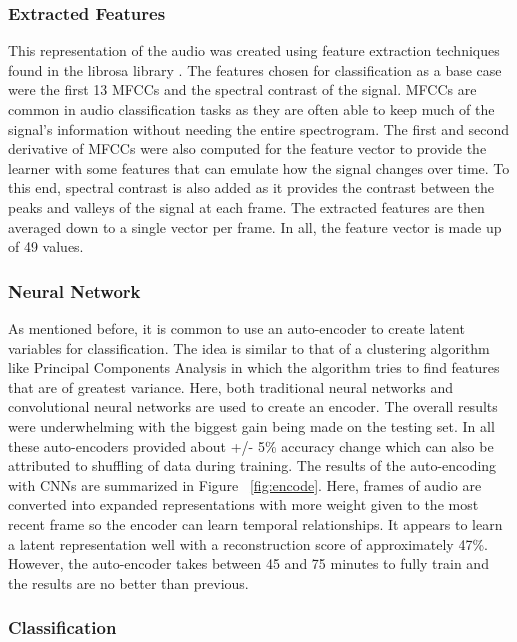 \subsubsection{Extracted Features}
This representation of the audio was created using feature extraction techniques found in the librosa library \cite{brian_mcfee_2018_1252297}. The features chosen for classification as a base case were the first 13 MFCCs and the spectral contrast of the signal. MFCCs are common in audio classification tasks as they are often able to keep much of the signal's information without needing the entire spectrogram. The first and second derivative of MFCCs were also computed for the feature vector to provide the learner with some features that can emulate how the signal changes over time. To this end, spectral contrast is also added as it provides the contrast between the peaks and valleys of the signal at each frame. The extracted features are then averaged down to a single vector per frame. In all, the feature vector is made up of 49 values.

\subsubsection{Neural Network}
As mentioned before, it is common to use an auto-encoder to create latent variables for classification. The idea is similar to that of a clustering algorithm like Principal Components Analysis in which the algorithm tries to find features that are of greatest variance. Here, both traditional neural networks and convolutional neural networks are used to create an encoder. The overall results were underwhelming with the biggest gain being made on the testing set. In all these auto-encoders provided about +/- 5\% accuracy change which can also be attributed to shuffling of data during training. The results of the auto-encoding with CNNs are summarized in Figure ~\ref{fig:encode}. Here, frames of audio are converted into expanded representations with more weight given to the most recent frame so the encoder can learn temporal relationships. It appears to learn a latent representation well with a reconstruction score of approximately 47\%. However, the auto-encoder takes between 45 and 75 minutes to fully train and the results are no better than previous.

\subsubsection{Classification}

